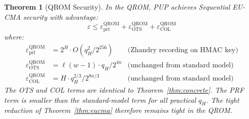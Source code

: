 \documentclass[11pt]{article}
\newtheorem{theorem}{Theorem}
\begin{document}
\begin{theorem}[QROM Security]\label{thm:qrom}
In the QROM, PUP achieves Sequential EU-CMA security with advantage:
\[
\varepsilon \leq \varepsilon_{\mathrm{prf}}^{\mathrm{QROM}} +
\varepsilon_{\mathrm{OTS}}^{\mathrm{QROM}} +
\varepsilon_{\mathrm{COL}}^{\mathrm{QROM}}
\]
where:
\begin{align}
\varepsilon_{\mathrm{prf}}^{\mathrm{QROM}} &=
2^H \cdot O(q_H^2 / 2^{256})
& \text{(Zhandry recording on HMAC key)} \\
\varepsilon_{\mathrm{OTS}}^{\mathrm{QROM}} &=
\ell(w-1) \cdot q_H / 2^{4n}
& \text{(unchanged from standard model)} \\
\varepsilon_{\mathrm{COL}}^{\mathrm{QROM}} &=
H \cdot q_H^{2/3} / 2^{8n/3}
& \text{(unchanged from standard model)}
\end{align}
The OTS and COL terms are identical to Theorem~\ref{thm:concrete}.
The PRF term is smaller than the standard-model term for all practical
$q_H$. The tight reduction of Theorem~\ref{thm:eucma} therefore
remains tight in the QROM.
\end{theorem}
\end{document}
